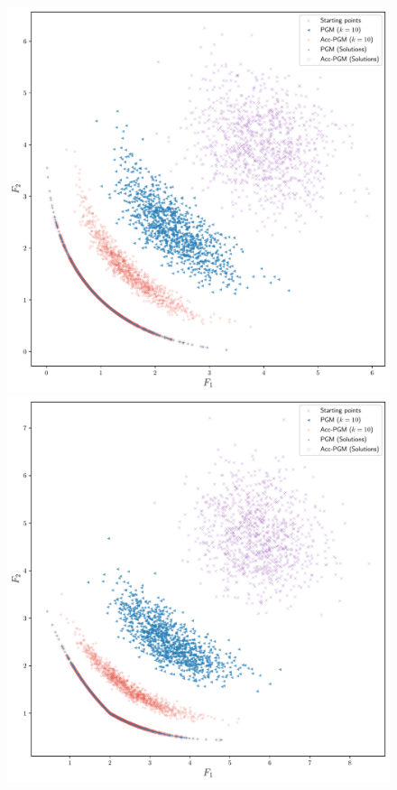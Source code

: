 \documentclass[../main]{subfiles}
\begin{document}
\begin{figure}[htbp]
    \centering
    \begin{minipage}[b]{.49\hsize}
        \centering
        \includegraphics[width=\textwidth]{figs/JOS1.pdf}
    \end{minipage}
    \begin{minipage}[b]{.49\hsize}
        \centering
        \includegraphics[width=\textwidth]{figs/JOS1_L1.pdf}

\end{minipage}
\end{figure}
\end{document}
